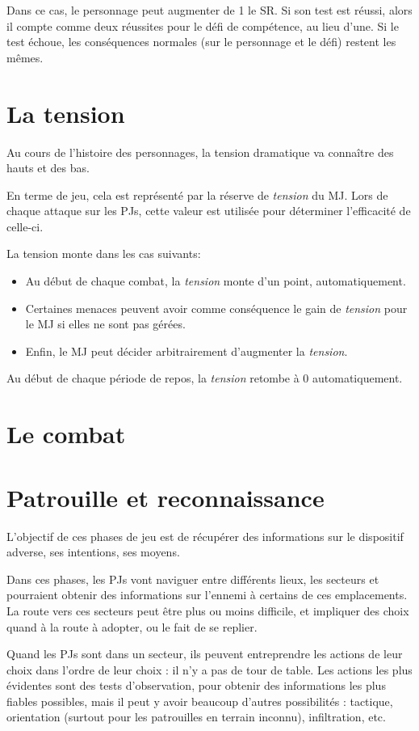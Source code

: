 \documentclass{report}
\begin{document}
\begin{multicols}{2}
Dans ce cas, le personnage peut augmenter de 1 le SR. Si son test est réussi, alors il compte comme deux réussites pour le défi de compétence, au lieu d'une. Si le test échoue, les conséquences normales (sur le personnage et le défi) restent les mêmes.

\section{La tension}
Au cours de l'histoire des personnages, la tension dramatique va connaître des hauts et des bas.

En terme de jeu, cela est représenté par la réserve de \emph{tension} du MJ. Lors de chaque attaque sur les PJs, cette valeur est utilisée pour déterminer l'efficacité de celle-ci.

La tension monte dans les cas suivants:
\begin{itemize}
    \item Au début de chaque combat, la \emph{tension} monte d'un point, automatiquement.
    \item Certaines menaces peuvent avoir comme conséquence le gain de \emph{tension} pour le MJ si elles ne sont pas gérées.
    \item Enfin, le MJ peut décider arbitrairement d'augmenter la \emph{tension}. %
\end{itemize}
Au début de chaque période de repos, la \emph{tension} retombe à 0 automatiquement.

\section{Le combat}
\section{Patrouille et reconnaissance}
L'objectif de ces phases de jeu est de récupérer des informations sur le dispositif adverse, ses intentions, ses moyens. 

Dans ces phases, les PJs vont naviguer entre différents lieux, les secteurs et pourraient obtenir des informations sur l'ennemi à certains de ces emplacements. La route vers ces secteurs peut être plus ou moins difficile, et impliquer des choix quand à la route à adopter, ou le fait de se replier.

Quand les PJs sont dans un secteur, ils peuvent entreprendre les actions de leur choix dans l'ordre de leur choix : il n'y a pas de tour de table. Les actions les plus évidentes sont des tests d'observation, pour obtenir des informations les plus fiables possibles, mais il peut y avoir beaucoup d'autres possibilités : tactique, orientation (surtout pour les patrouilles en terrain inconnu), infiltration, etc. 


\end{multicols}
\end{document}
